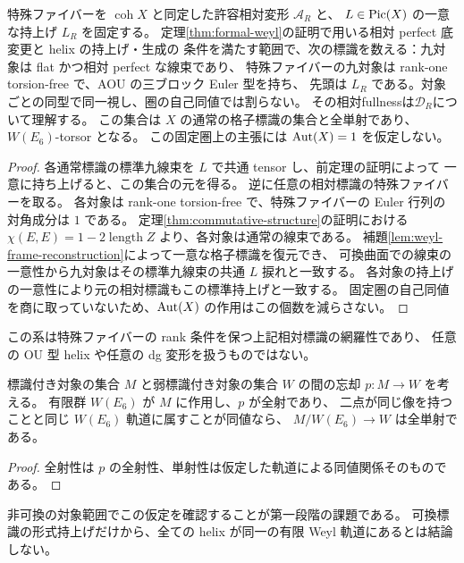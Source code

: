 \begin{corollary}\label{cor:formal-all-line-markings}
特殊ファイバーを $\operatorname{coh}X$ と同定した許容相対変形 $\mathcal A_R$ と、
$L\in\operatorname{Pic}(X)$ の一意な持上げ $L_R$ を固定する。
定理\ref{thm:formal-weyl}の証明で用いる相対 perfect 底変更と helix の持上げ・生成の
条件を満たす範囲で、次の標識を数える：九対象は flat かつ相対 perfect な線束であり、
特殊ファイバーの九対象は rank-one torsion-free で、AOU の三ブロック Euler 型を持ち、
先頭は $L_R$ である。対象ごとの同型で同一視し、圏の自己同値では割らない。
その相対fullnessは$\mathcal D_R$について理解する。
この集合は $X$ の通常の格子標識の集合と全単射であり、$W(E_6)$-torsor となる。
この固定圏上の主張には $\operatorname{Aut}(X)=1$ を仮定しない。
\end{corollary}
\begin{proof}
各通常標識の標準九線束を $L$ で共通 tensor し、前定理の証明によって
一意に持ち上げると、この集合の元を得る。
逆に任意の相対標識の特殊ファイバーを取る。
各対象は rank-one torsion-free で、特殊ファイバーの Euler 行列の対角成分は $1$ である。
定理\ref{thm:commutative-structure}の証明における
$\chi(E,E)=1-2\operatorname{length}Z$ より、各対象は通常の線束である。
補題\ref{lem:weyl-frame-reconstruction}によって一意な格子標識を復元でき、
可換曲面での線束の一意性から九対象はその標準九線束の共通 $L$ 捩れと一致する。
各対象の持上げの一意性により元の相対標識もこの標準持上げと一致する。
固定圏の自己同値を商に取っていないため、$\operatorname{Aut}(X)$ の作用はこの個数を減らさない。
\end{proof}
この系は特殊ファイバーの rank 条件を保つ上記相対標識の網羅性であり、
任意の OU 型 helix や任意の dg 変形を扱うものではない。

\begin{proposition}\label{prop:global-weyl-criterion}
標識付き対象の集合 $M$ と弱標識付き対象の集合 $W$ の間の忘却 $p:M\to W$ を考える。
有限群 $W(E_6)$ が $M$ に作用し、$p$ が全射であり、
二点が同じ像を持つことと同じ $W(E_6)$ 軌道に属すことが同値なら、
$M/W(E_6)\to W$ は全単射である。
\end{proposition}
\begin{proof}
全射性は $p$ の全射性、単射性は仮定した軌道による同値関係そのものである。
\end{proof}
非可換の対象範囲でこの仮定を確認することが第一段階の課題である。
可換標識の形式持上げだけから、全ての helix が同一の有限 Weyl 軌道にあるとは結論しない。

